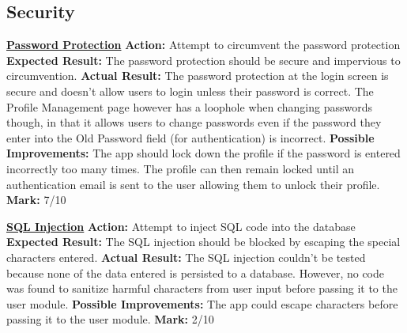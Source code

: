 \documentclass{article}
\begin{document}
		\subsection{Security}\label{subsec:overall-security}
		    \textbf{\underline{Password Protection}}\newline
		    \textbf{Action:} Attempt to circumvent the password protection\newline
            \textbf{Expected Result:} The password protection should be secure and impervious to circumvention.\newline
            \textbf{Actual Result:} The password protection at the login screen is secure and doesn't allow users to login unless their password is correct. The Profile Management page however has a loophole when changing passwords though, in that it allows users to change passwords even if the password they enter into the Old Password field (for authentication) is incorrect.\newline
            \textbf{Possible Improvements:} The app should lock down the profile if the password is entered incorrectly too many times. The profile can then remain locked until an authentication email is sent to the user allowing them to unlock their profile. \newline
            \textbf{Mark:} 7/10\newline
            
            \textbf{\underline{SQL Injection}}\newline
		    \textbf{Action:} Attempt to inject SQL code into the database\newline
            \textbf{Expected Result:} The SQL injection should be blocked by escaping the special characters entered.\newline
            \textbf{Actual Result:} The SQL injection couldn't be tested because none of the data entered is persisted to a database. However, no code was found to sanitize harmful characters from user input before passing it to the user module. \newline
            \textbf{Possible Improvements:} The app could escape characters before passing it to the user module. \newline
            \textbf{Mark:} 2/10\newline
\end{document}
